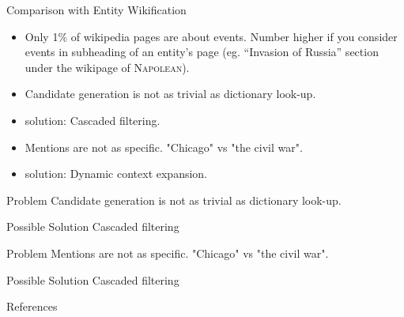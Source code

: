 
\begin{frame}{Comparison with Entity Wikification}

\begin{itemize}
\item Only 1\% of wikipedia pages are about events. Number higher if you consider events in subheading of an entity's page (eg. ``Invasion of Russia'' section under the wikipage of \textsc{Napolean}).
\item Candidate generation is not as trivial as dictionary look-up.
\pause
\item {\color{red}solution:} Cascaded filtering.
\pause
\item Mentions are not as specific. "Chicago" vs "the civil war".
\pause
\item {\color{red}solution:} Dynamic context expansion.
\end{itemize}
\end{frame}

\begin{frame}

\begin{block}{Problem}
Candidate generation is not as trivial as dictionary look-up.
\end{block}

\begin{exampleblock}{Possible Solution}
Cascaded filtering
\end{exampleblock}

\begin{block}{Problem}
Mentions are not as specific. "Chicago" vs "the civil war".
\end{block}

\begin{exampleblock}{Possible Solution}
Cascaded filtering
\end{exampleblock}
\end{frame}






\begin{frame}[allowframebreaks]{References}
\def\newblock{}


\end{frame}


